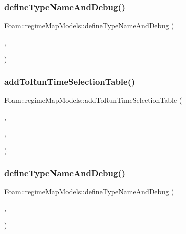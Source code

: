 \subsubsection{\texorpdfstring{define\+Type\+Name\+And\+Debug()}{defineTypeNameAndDebug()}\hspace{0.1cm}{\footnotesize\ttfamily [1/4]}}
{\footnotesize\ttfamily Foam\+::regime\+Map\+Models\+::define\+Type\+Name\+And\+Debug (\begin{DoxyParamCaption}\item[{\hyperlink{classFoam_1_1regimeMapModels_1_1oneParameter}{one\+Parameter}}]{,  }\item[{0}]{ }\end{DoxyParamCaption})}

\mbox{\label{namespaceFoam_1_1regimeMapModels_a5cca710ac6ca9856c037c93bbd40aa2e}} 
\subsubsection{\texorpdfstring{add\+To\+Run\+Time\+Selection\+Table()}{addToRunTimeSelectionTable()}\hspace{0.1cm}{\footnotesize\ttfamily [1/2]}}
{\footnotesize\ttfamily Foam\+::regime\+Map\+Models\+::add\+To\+Run\+Time\+Selection\+Table (\begin{DoxyParamCaption}\item[{\hyperlink{classFoam_1_1regimeMapModel}{regime\+Map\+Model}}]{,  }\item[{\hyperlink{classFoam_1_1regimeMapModels_1_1oneParameter}{one\+Parameter}}]{,  }\item[{regime\+Map\+Models}]{ }\end{DoxyParamCaption})}

\mbox{\label{namespaceFoam_1_1regimeMapModels_aaf5d12e884853ed4151ffd657ca9905f}} 
\subsubsection{\texorpdfstring{define\+Type\+Name\+And\+Debug()}{defineTypeNameAndDebug()}\hspace{0.1cm}{\footnotesize\ttfamily [2/4]}}
{\footnotesize\ttfamily Foam\+::regime\+Map\+Models\+::define\+Type\+Name\+And\+Debug (\begin{DoxyParamCaption}\item[{\hyperlink{classFoam_1_1regimeMapModels_1_1regimeBoundary2D}{regime\+Boundary2D}}]{,  }\item[{0}]{ }\end{DoxyParamCaption})}

